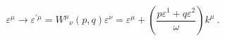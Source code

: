 \begin{equation}
\varepsilon^{\mu} \rightarrow \varepsilon^{\prime \mu} = {W^{\mu}}_{\nu}(p, q) \varepsilon^{\nu} = \varepsilon^{\mu} +
 \left( \frac{p\varepsilon^1 + q\varepsilon^2}{\omega}\right)k^{\mu}~.
\label{14}
\end{equation}

